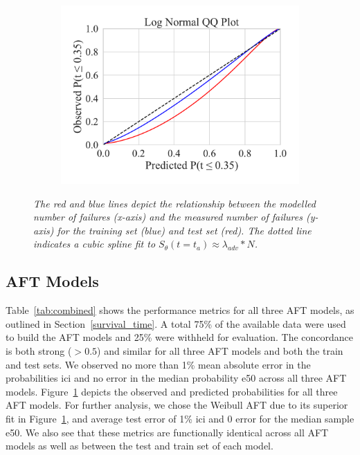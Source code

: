 \documentclass[conference]{IEEEtran}
\newcommand{\cm}[1]{\textit{{\color{blue}#1}}}
\begin{document}
\begin{figure}[h!]
\begin{subfigure}[b]{.3\linewidth}
        \includegraphics[width=\linewidth,clip]{plots/combined/log_normal_qq.pdf}
        \caption{}
    \end{subfigure}
    \caption{\cm{The red and blue lines depict the relationship between the modelled number of failures (x-axis) and the measured number of failures (y-axis) for the training set (blue) and test set (red). The dotted line indicates a cubic spline fit to $S_{\theta}(t=t_a) \approx \lambda_{adv} * N $.}}
    \label{fig:qq}
\end{figure}
\subsection{AFT Models}
\label{res:aft}

Table~\ref{tab:combined} shows the performance metrics for all three AFT models, as outlined in Section~\ref{survival_time}. A total 75\% of the available data were used to build the AFT models and 25\% were withheld for evaluation. The concordance is both strong ($>0.5$) and similar for all three AFT models and both the train and test sets. We observed no more than 1\% mean absolute error in the probabilities \acrshort{ici} and no error in the median probability \acrshort{e50} across all three AFT models. Figure~\ref{fig:qq} depicts the observed and predicted probabilities for all three AFT models. For further analysis, we chose the Weibull AFT due to its superior fit in Figure~\ref{fig:qq}, and average test error of 1\% \acrshort{ici} and 0 error for the median sample \acrshort{e50}. We also see that these metrics are  functionally identical across all AFT models as well as between the test and train set of each model. 
\end{document}

